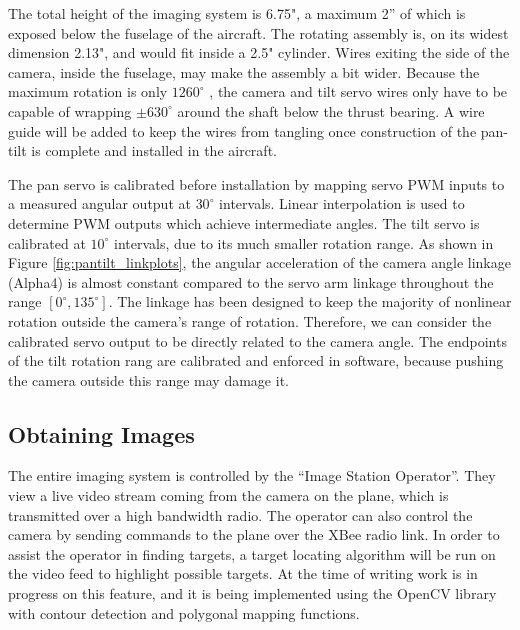 \documentclass[10pt]{report}
\newcommand{\degrees}[1]
{
\begin{math}
#1^{\circ} 
\end{math}
}
\begin{document}
The total height of the imaging system is 6.75", a maximum 2'' of which is exposed below the fuselage of the aircraft. The rotating assembly is, on its widest dimension 2.13", and would fit inside a 2.5" cylinder. Wires exiting the side of the camera, inside the fuselage, may make the assembly a bit wider. Because the maximum rotation is only \degrees{1260}, the camera and tilt servo wires only have to be capable of wrapping \degrees{\pm 630} around the shaft below the thrust bearing. A wire guide will be added to keep the wires from tangling once construction of the pan-tilt is complete and installed in the aircraft. 

The pan servo is calibrated before installation by mapping servo PWM inputs to a measured angular output at \degrees{30} intervals. Linear interpolation is used to determine PWM outputs which achieve intermediate angles. The tilt servo is calibrated at \degrees{10} intervals, due to its much smaller rotation range. As shown in Figure \ref{fig:pantilt_linkplots}, the angular acceleration of the camera angle linkage (Alpha4) is almost constant compared to the servo arm linkage throughout the range $[0^{\circ}, 135^{\circ}]$. The linkage has been designed to keep the majority of nonlinear rotation outside the camera's range of rotation. Therefore, we can consider the calibrated servo output to be directly related to the camera angle.
The endpoints of the tilt rotation rang are calibrated and enforced in software, because pushing the camera outside this range may damage it.

\subsection{Obtaining Images}

The entire imaging system is controlled by the ``Image Station Operator''.  They view a live video stream coming from the camera on the plane, which is transmitted over a high bandwidth radio.  The operator can also control the camera by sending commands to the plane over the XBee radio link.  In order to assist the operator in finding targets, a target locating algorithm will be run on the video feed to highlight possible targets.  At the time of writing work is in progress on this feature, and it is being implemented using the OpenCV library \cite{opencv} with contour detection and polygonal mapping functions.
\end{document}
